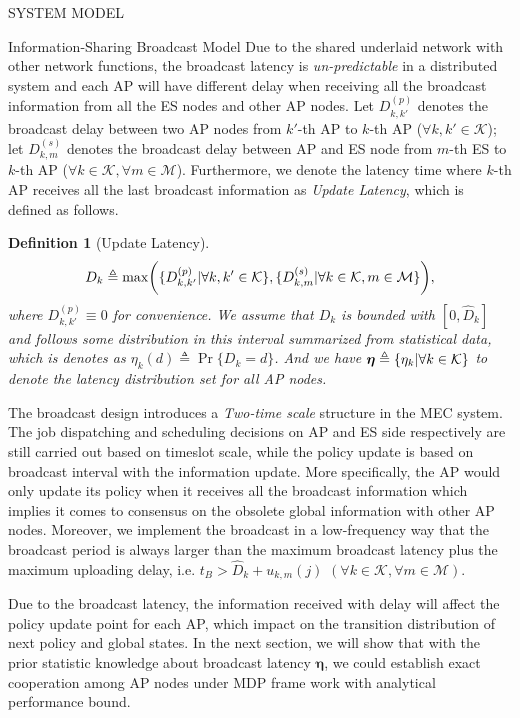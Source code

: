 \documentclass[10pt, conference, letterpaper]{IEEEtran}
\newtheorem{definition}{Definition}
\newcommand{\define}{\triangleq}
\newcommand{\vecG}{\boldsymbol}
\DeclarePairedDelimiter{\set}{\{}{\}}
\DeclarePairedDelimiter{\Paren}{\bigg(}{\bigg)}
\newcommand{\apSet}{\mathcal{K}}
\newcommand{\esSet}{\mathcal{M}}
\begin{document}
\begin{section}{SYSTEM MODEL}
\begin{subsection}{Information-Sharing Broadcast Model}
            {\color{red}Due to the shared underlaid network with other network functions, the broadcast latency is \emph{un-predictable} in a distributed system and each AP will have different delay when receiving all the broadcast information from all the ES nodes and other AP nodes.}
            Let $D^{(p)}_{k,k'}$ denotes the broadcast delay between two AP nodes from $k'$-th AP to $k$-th AP ($\forall k,k'\in\apSet$); let $D^{(s)}_{k,m}$ denotes the broadcast delay between AP and ES node from $m$-th ES to $k$-th AP ($\forall k\in\apSet,\forall m\in\esSet$).
            Furthermore, we denote the latency time where $k$-th AP receives all the last broadcast information as \emph{Update Latency}, which is defined as follows.
            \begin{definition}[Update Latency]
                \begin{align}
                    D_k \define \max\Paren{
                        \set{D^{(p)}_{k,k'}|\forall k,k'\in\apSet},
                        \set{D^{(s)}_{k,m}|\forall k\in\apSet,m\in\esSet}
                    },
                \end{align}
                where $D^{(p)}_{k,k'} \equiv 0$ for convenience. {\color{red}We assume that $D_k$ is bounded with $[0, \hat{D}_k]$ and follows some distribution in this interval summarized from statistical data, which is denotes as $\eta_k(d) \define \Pr\{D_k=d\}$. And we have $\vecG{\eta} \define \set{\eta_k|\forall k\in\apSet}$ to denote the latency distribution set for all AP nodes.}
            \end{definition}

            The broadcast design introduces a \emph{Two-time scale} structure in the MEC system.
            The job dispatching and scheduling decisions on AP and ES side respectively are still carried out based on timeslot scale, while the policy update is based on broadcast interval with the information update.
            More specifically, the AP would only update its policy when it receives all the broadcast information which implies it comes to consensus on the obsolete global information with other AP nodes.
            {\color{red}Moreover, we implement the broadcast in a low-frequency way that the broadcast period is always larger than the maximum broadcast latency plus the maximum uploading delay, i.e. $t_B > \hat{D}_{k} + u_{k,m}(j)$ $(\forall k\in\apSet, \forall m\in\esSet)$.}

            Due to the broadcast latency, the information received with delay will affect the policy update point for each AP, which impact on the transition distribution of next policy and global states.
            {\color{red}In the next section, we will show that with the prior statistic knowledge about broadcast latency $\vecG{\eta}$, we could establish exact cooperation among AP nodes under MDP frame work with analytical performance bound.}
        \end{subsection}
    \end{section}
\end{document}
